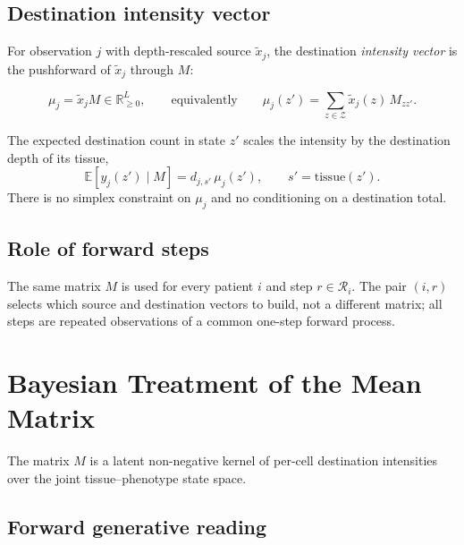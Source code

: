 \documentclass[11pt]{article}
\newcommand{\Reals}{\mathbb{R}}
\newcommand{\Zsp}{\mathcal{Z}}                    %
\newcommand{\Rsp}{\mathcal{R}}                    %
\newcommand{\E}{\mathbb{E}}
\theoremstyle{definition}
\begin{document}
\subsection{Destination intensity vector}
\label{sec:intensity}

For observation $j$ with depth-rescaled source $\tilde{x}_j$, the destination
\emph{intensity vector} is the pushforward of $\tilde{x}_j$ through $M$:

\begin{keybox}[title={Destination intensity}]
\[
  \mu_j = \tilde{x}_j M \in \Reals_{\geq 0}^{L},
  \qquad\text{equivalently}\qquad
  \mu_j(z')
  =
  \sum_{z\in\Zsp} \tilde{x}_j(z)\, M_{zz'} .
\]
\end{keybox}

The expected destination count in state $z'$ scales the intensity by the
destination depth of its tissue,
\[
  \E\!\left[ y_j(z') \mid M \right] = d_{j,s'}\, \mu_j(z'),
  \qquad s' = \mathrm{tissue}(z') .
\]
There is no simplex constraint on $\mu_j$ and no conditioning on a destination
total.

\subsection{Role of forward steps}

The same matrix $M$ is used for every patient $i$ and step $r \in \Rsp_i$. The
pair $(i,r)$ selects which source and destination vectors to build, not a
different matrix; all steps are repeated observations of a common one-step
forward process.

\section{Bayesian Treatment of the Mean Matrix}

The matrix $M$ is a latent non-negative kernel of per-cell destination
intensities over the joint tissue--phenotype state space.

\subsection{Forward generative reading}
\end{document}
